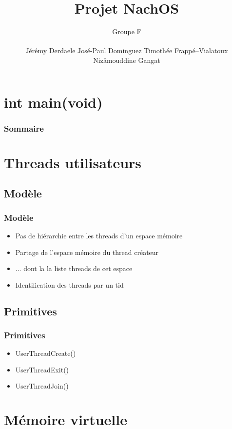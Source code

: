 \documentclass{beamer}
\title{Projet NachOS}
\author{
  Groupe F \newline{}
  {\rule{5cm}{0.4pt}}\newline{}
  Jérémy Derdaele\newline{}
  José-Paul Dominguez\newline{}
  Timothée Frappé--Vialatoux\newline{}
  Nizâmouddine Gangat\newline{}
  {\rule{5cm}{0.4pt}}\newline{}
}
\begin{document}
\begin{frame}
  \titlepage
\end{frame}

\section*{int main(void)}
\begin{frame}
  \frametitle{Sommaire}
  \tableofcontents
\end{frame}

\section{Threads utilisateurs}
\subsection{Modèle}
\begin{frame}
  \frametitle{Modèle}
  \begin{itemize}
  \item Pas de hiérarchie entre les threads d'un espace mémoire
  \item Partage de l'espace mémoire du thread créateur
  \item ... dont la la liste threads de cet espace
  \item Identification des threads par un tid
  \end{itemize}
\end{frame}

\subsection{Primitives}
\begin{frame}
  \frametitle{Primitives}
  \begin{itemize}
    \item UserThreadCreate()
    \item UserThreadExit()
    \item UserThreadJoin()
  \end{itemize}
\end{frame}

\section{Mémoire virtuelle}
\end{document}
